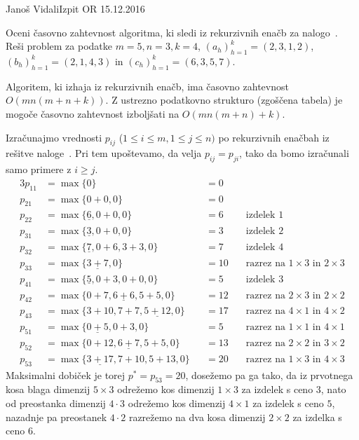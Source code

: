 \begin{naloga}{Janoš Vidali}{Izpit OR 15.12.2016}
\begin{vprasanje}
Oceni časovno zahtevnost algoritma,
ki sledi iz rekurzivnih enačb za nalogo~\nal[blago].
Reši problem za podatke $m = 5, n = 3, k = 4$,
$(a_h)_{h=1}^k = (2, 3, 1, 2)$, $(b_h)_{h=1}^k = (2, 1, 4, 3)$
in $(c_h)_{h=1}^k = (6, 3, 5, 7)$.
\end{vprasanje}

\begin{odgovor}
Algoritem, ki izhaja iz rekurzivnih enačb,
ima časovno zahtevnost $O(mn(m + n + k))$.
Z ustrezno podatkovno strukturo (zgoščena tabela)
je mogoče časovno zahtevnost izboljšati na $O(mn(m + n) + k)$.

Izračunajmo vrednosti $p_{ij}$ ($1 \le i \le m, 1 \le j \le n)$
po rekurzivnih enačbah iz rešitve naloge~\res[blago].
Pri tem upoštevamo, da velja $p_{ij} = p_{ji}$,
tako da bomo izračunali samo primere z $i \ge j$.
\begin{alignat*}{3}
p_{11} &= \max\{0\} &&= 0 \\
p_{21} &= \max\{0 + 0, 0\} &&= 0 \\
p_{22} &= \max\{\underline{6}, 0 + 0, 0\} &&= 6 &\quad \text{izdelek $1$} \\
p_{31} &= \max\{\underline{3}, 0 + 0, 0\} &&=3 &\quad \text{izdelek $2$} \\
p_{32} &= \max\{\underline{7}, 0 + 6, 3 + 3, 0\} &&=7 &\quad \text{izdelek $4$} \\
p_{33} &= \max\{\underline{3 + 7}, 0\} &&= 10 &\quad \text{razrez na $1 \times 3$ in $2 \times 3$} \\
p_{41} &= \max\{\underline{5}, 0 + 3, 0 + 0, 0\} &&=5 &\quad \text{izdelek $3$} \\
p_{42} &= \max\{0 + 7, \underline{6 + 6}, 5 + 5, 0\} &&= 12 &\quad \text{razrez na $2 \times 3$ in $2 \times 2$} \\
p_{43} &= \max\{3 + 10, 7 + 7, \underline{5 + 12}, 0\} &&= 17 &\quad \text{razrez na $4 \times 1$ in $4 \times 2$} \\
p_{51} &= \max\{\underline{0 + 5}, 0 + 3, 0\} &&=5 &\quad \text{razrez na $1 \times 1$ in $4 \times 1$} \\
p_{52} &= \max\{0 + 12, \underline{6 + 7}, 5 + 5, 0\} &&= 13 &\quad \text{razrez na $2 \times 2$ in $3 \times 2$} \\
p_{53} &= \max\{\underline{3 + 17}, 7 + 10, 5 + 13, 0\} &&= 20 &\quad \text{razrez na $1 \times 3$ in $4 \times 3$}
\end{alignat*}
Maksimalni dobiček je torej $p^* = p_{53} = 20$, dosežemo pa ga tako,
da iz prvotnega kosa blaga dimenzij $5 \times 3$
odrežemo kos dimenzij $1 \times 3$ za izdelek s ceno $3$,
nato od preostanka dimenzij $4 \cdot 3$
odrežemo kos dimenzij $4 \times 1$ za izdelek s ceno $5$,
nazadnje pa preostanek $4 \cdot 2$
razrežemo na dva kosa dimenzij $2 \times 2$ za izdelka s ceno $6$.
\end{odgovor}
\end{naloga}
